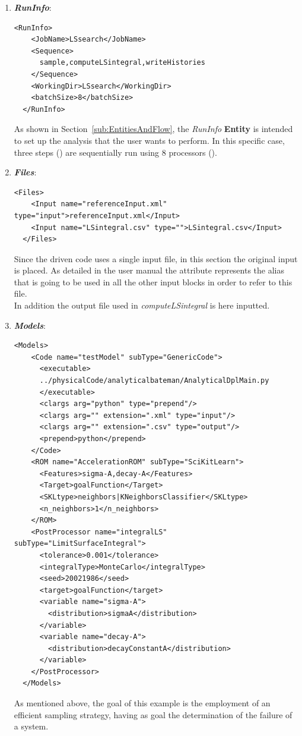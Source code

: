 \begin{enumerate}
   \item \textbf{\textit{RunInfo}}:
\begin{lstlisting}[style=XML,morekeywords={arg,extension,pauseAtEnd,overwrite}]
  <RunInfo>
    <JobName>LSsearch</JobName>
    <Sequence>
      sample,computeLSintegral,writeHistories
    </Sequence>
    <WorkingDir>LSsearch</WorkingDir>
    <batchSize>8</batchSize>
  </RunInfo>
\end{lstlisting}   
   As shown in Section~\ref{sub:EntitiesAndFlow}, the \textit{RunInfo} \textbf{Entity} is intended to set up the analysis 
   that the user wants to perform. In this specific case, three steps () are  sequentially run 
   using 8 processors (). 
   \item \textbf{\textit{Files}}:
\begin{lstlisting}[style=XML,morekeywords={arg,extension,pauseAtEnd,overwrite}]
  <Files>
    <Input name="referenceInput.xml" type="input">referenceInput.xml</Input>
    <Input name="LSintegral.csv" type="">LSintegral.csv</Input>
  </Files>
\end{lstlisting}
   Since the driven code uses a single input file, in this section the original input is placed. As detailed in the user manual
   the attribute   represents the alias that is going to be 
   used in all the other input blocks in order to refer to this file. 
   \\In addition the output file used in  
   \textit{computeLSintegral} is here inputted.
   \item \textbf{\textit{Models}}:
\begin{lstlisting}[style=XML,morekeywords={arg,extension,pauseAtEnd,overwrite}]
  <Models>
    <Code name="testModel" subType="GenericCode">
      <executable>
      ../physicalCode/analyticalbateman/AnalyticalDplMain.py
      </executable>
      <clargs arg="python" type="prepend"/>
      <clargs arg="" extension=".xml" type="input"/>
      <clargs arg="" extension=".csv" type="output"/>
      <prepend>python</prepend>
    </Code>
    <ROM name="AccelerationROM" subType="SciKitLearn">
      <Features>sigma-A,decay-A</Features>
      <Target>goalFunction</Target>
      <SKLtype>neighbors|KNeighborsClassifier</SKLtype>
      <n_neighbors>1</n_neighbors>
    </ROM>
    <PostProcessor name="integralLS" subType="LimitSurfaceIntegral">
      <tolerance>0.001</tolerance>
      <integralType>MonteCarlo</integralType>
      <seed>20021986</seed>
      <target>goalFunction</target>
      <variable name="sigma-A">
        <distribution>sigmaA</distribution>
      </variable>
      <variable name="decay-A">
        <distribution>decayConstantA</distribution>
      </variable>
    </PostProcessor>
  </Models>
\end{lstlisting}
 As mentioned above, the goal of this example is the employment of 
 an efficient sampling strategy, having as goal the determination of the
 failure of a system.
 

\end{enumerate}

